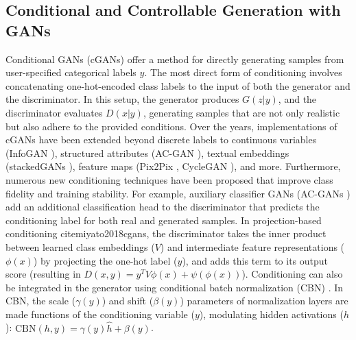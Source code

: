 \subsection*{Conditional and Controllable Generation with GANs}
Conditional GANs (cGANs) \cite{mirza2014conditional} offer a method for directly generating samples from user-specified categorical labels $y$. The most direct form of conditioning involves concatenating one-hot-encoded class labels to the input of both the generator and the discriminator. In this setup, the generator produces $G(z|y)$, and the discriminator evaluates $D(x|y)$, generating samples that are not only realistic but also adhere to the provided conditions. Over the years, implementations of cGANs have been extended beyond discrete labels to continuous variables (InfoGAN \cite{chen2016infogan}), structured attributes (AC-GAN \cite{odena2017conditional}), textual embeddings (stackedGANs \cite{zhang2018stackgan++}), feature maps (Pix2Pix \cite{isola2017image}, CycleGAN \cite{zhu2017unpaired}), and more. Furthermore, numerous new conditioning techniques have been proposed that improve class fidelity and training stability. For example, auxiliary classifier GANs (AC-GANs \cite{odena2017conditional}) add an additional classification head to the discriminator that predicts the conditioning label for both real and generated samples. In projection-based conditioning cite{miyato2018cgans}, the discriminator takes the inner product between learned class embeddings ($V$) and intermediate feature representations ($\phi(x)$) by projecting the one-hot label ($y$), and adds this term to its output score (resulting in $D(x, y) =  y^TV\phi(x) + \psi(\phi(x))$). Conditioning can also be integrated in the generator using conditional batch normalization (CBN) \cite{de2017modulating}. In CBN, the scale ($\gamma(y)$) and shift ($\beta(y)$) parameters of normalization layers are made functions of the conditioning variable ($y$), modulating hidden activations ($h$): $\text{CBN}(h, y) = \gamma(y) \hat{h} + \beta(y)$.

